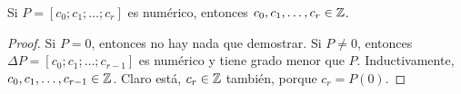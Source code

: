 \begin{proposition}
Si $P = [c_0; c_1; \dots; c_r]$ es numérico, entonces $c_0, c_1, \dots, c_r \in \mathbb Z$.
\end{proposition}

\begin{proof}
Si $P = 0$, entonces no hay nada que demostrar. Si $P \ne 0$, entonces $\Delta P = [c_0; c_1; \dots; c_{r-1}]$ es numérico y tiene grado menor que $P$. Inductivamente, $c_0, c_1, \dots, c_{r-1} \in \mathbb Z$. Claro está, $c_r \in \mathbb Z$ también, porque $c_r = P(0)$.
\end{proof}
